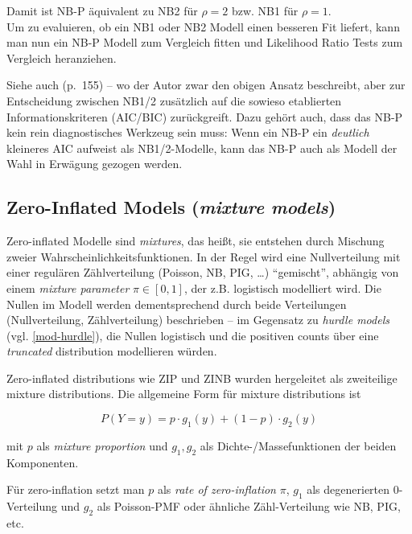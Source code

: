 \documentclass[ngerman,a4paper,]{scrartcl}
\theoremstyle{definition}
\theoremstyle{definition}
\theoremstyle{definition}
\theoremstyle{remark}
\begin{document}
Damit ist NB-P äquivalent zu NB2 für \(\rho = 2\) bzw. NB1 für \(\rho = 1\).\\
Um zu evaluieren, ob ein NB1 oder NB2 Modell einen besseren Fit liefert, kann man nun ein NB-P Modell zum Vergleich fitten und Likelihood Ratio Tests zum Vergleich heranziehen.

Siehe auch \citet{hilbeModelingCountData2014} (p.~155) -- wo der Autor zwar den obigen Ansatz beschreibt, aber zur Entscheidung zwischen NB1/2 zusätzlich auf die sowieso etablierten Informationskriteren (AIC/BIC) zurückgreift. Dazu gehört auch, dass das NB-P kein rein diagnostisches Werkzeug sein muss: Wenn ein NB-P ein \emph{deutlich} kleineres AIC aufweist als NB1/2-Modelle, kann das NB-P auch als Modell der Wahl in Erwägung gezogen werden.

\hypertarget{mod-zi}{%
\subsection{\texorpdfstring{Zero-Inflated Models (\emph{mixture models})}{Zero-Inflated Models (mixture models)}}\label{mod-zi}}

Zero-inflated Modelle sind \emph{mixtures}, das heißt, sie entstehen durch Mischung zweier Wahrscheinlichkeitsfunktionen. In der Regel wird eine Nullverteilung mit einer regulären Zählverteilung (Poisson, NB, PIG, \ldots{}) \enquote{gemischt}, abhängig von einem \emph{mixture parameter} \(\pi \in [0,1]\), der z.B. logistisch modelliert wird. Die Nullen im Modell werden dementsprechend durch beide Verteilungen (Nullverteilung, Zählverteilung) beschrieben -- im Gegensatz zu \emph{hurdle models} (vgl. \ref{mod-hurdle}), die Nullen logistisch und die positiven counts über eine \emph{truncated} distribution modellieren würden.

Zero-inflated distributions wie ZIP und ZINB wurden hergeleitet als zweiteilige mixture distributions. Die allgemeine Form für mixture distributions ist

\begin{equation*}
  P(Y = y) = p \cdot g_1(y) + (1-p) \cdot g_2(y)
\end{equation*}

mit \(p\) als \emph{mixture proportion} und \(g_1, g_2\) als Dichte-/Massefunktionen der beiden Komponenten.

Für zero-inflation setzt man \(p\) als \emph{rate of zero-inflation} \(\pi\), \(g_1\) als degenerierten 0-Verteilung und \(g_2\) als Poisson-PMF oder ähnliche Zähl-Verteilung wie NB, PIG, etc.
\end{document}
